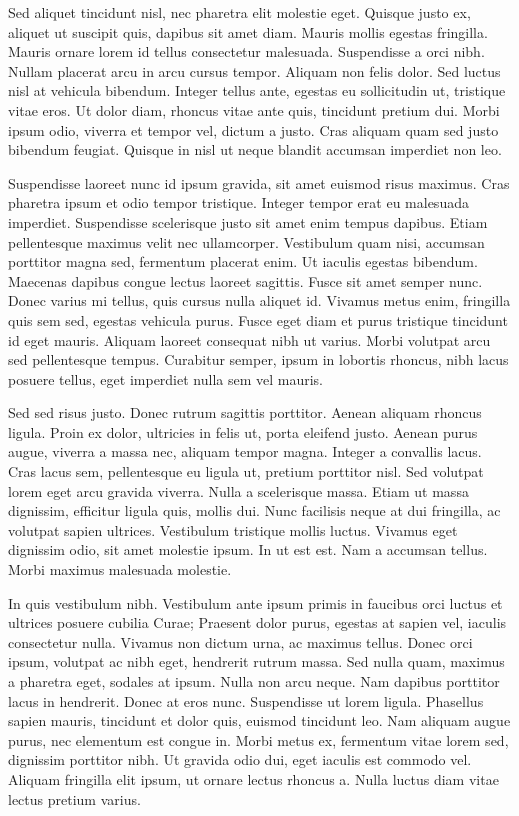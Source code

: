 Sed aliquet tincidunt nisl, nec pharetra elit molestie eget. Quisque justo ex, aliquet ut suscipit quis, dapibus sit amet diam. Mauris mollis egestas fringilla. Mauris ornare lorem id tellus consectetur malesuada. Suspendisse a orci nibh. Nullam placerat arcu in arcu cursus tempor. Aliquam non felis dolor. Sed luctus nisl at vehicula bibendum. Integer tellus ante, egestas eu sollicitudin ut, tristique vitae eros. Ut dolor diam, rhoncus vitae ante quis, tincidunt pretium dui. Morbi ipsum odio, viverra et tempor vel, dictum a justo. Cras aliquam quam sed justo bibendum feugiat. Quisque in nisl ut neque blandit accumsan imperdiet non leo.

Suspendisse laoreet nunc id ipsum gravida, sit amet euismod risus maximus. Cras pharetra ipsum et odio tempor tristique. Integer tempor erat eu malesuada imperdiet. Suspendisse scelerisque justo sit amet enim tempus dapibus. Etiam pellentesque maximus velit nec ullamcorper. Vestibulum quam nisi, accumsan porttitor magna sed, fermentum placerat enim. Ut iaculis egestas bibendum. Maecenas dapibus congue lectus laoreet sagittis. Fusce sit amet semper nunc. Donec varius mi tellus, quis cursus nulla aliquet id. Vivamus metus enim, fringilla quis sem sed, egestas vehicula purus. Fusce eget diam et purus tristique tincidunt id eget mauris. Aliquam laoreet consequat nibh ut varius. Morbi volutpat arcu sed pellentesque tempus. Curabitur semper, ipsum in lobortis rhoncus, nibh lacus posuere tellus, eget imperdiet nulla sem vel mauris.

Sed sed risus justo. Donec rutrum sagittis porttitor. Aenean aliquam rhoncus ligula. Proin ex dolor, ultricies in felis ut, porta eleifend justo. Aenean purus augue, viverra a massa nec, aliquam tempor magna. Integer a convallis lacus. Cras lacus sem, pellentesque eu ligula ut, pretium porttitor nisl. Sed volutpat lorem eget arcu gravida viverra. Nulla a scelerisque massa. Etiam ut massa dignissim, efficitur ligula quis, mollis dui. Nunc facilisis neque at dui fringilla, ac volutpat sapien ultrices. Vestibulum tristique mollis luctus. Vivamus eget dignissim odio, sit amet molestie ipsum. In ut est est. Nam a accumsan tellus. Morbi maximus malesuada molestie.

In quis vestibulum nibh. Vestibulum ante ipsum primis in faucibus orci luctus et ultrices posuere cubilia Curae; Praesent dolor purus, egestas at sapien vel, iaculis consectetur nulla. Vivamus non dictum urna, ac maximus tellus. Donec orci ipsum, volutpat ac nibh eget, hendrerit rutrum massa. Sed nulla quam, maximus a pharetra eget, sodales at ipsum. Nulla non arcu neque. Nam dapibus porttitor lacus in hendrerit. Donec at eros nunc. Suspendisse ut lorem ligula. Phasellus sapien mauris, tincidunt et dolor quis, euismod tincidunt leo. Nam aliquam augue purus, nec elementum est congue in. Morbi metus ex, fermentum vitae lorem sed, dignissim porttitor nibh. Ut gravida odio dui, eget iaculis est commodo vel. Aliquam fringilla elit ipsum, ut ornare lectus rhoncus a. Nulla luctus diam vitae lectus pretium varius.

